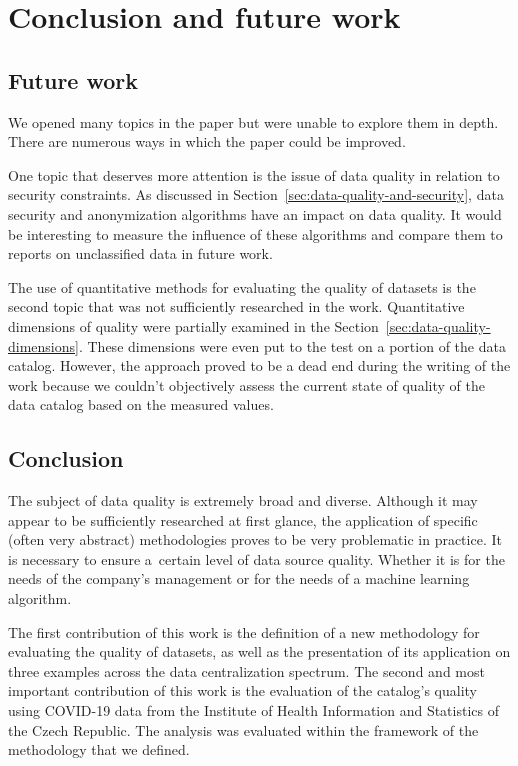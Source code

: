 \chapter{Conclusion and future work}\label{ch:conclusion-and-future-work}

\section{Future work}\label{sec:future-work}

We opened many topics in the paper but were unable to explore them in depth.
There are numerous ways in which the paper could be improved.

One topic that deserves more attention is the issue of data quality in relation to security constraints.
As discussed in Section~\ref{sec:data-quality-and-security}, data security and anonymization algorithms have an impact on data quality.
It would be interesting to measure the influence of these algorithms and compare them to reports on unclassified data in future work.

The use of quantitative methods for evaluating the quality of datasets is the second topic that was not sufficiently researched in the work.
Quantitative dimensions of quality were partially examined in the Section~\ref{sec:data-quality-dimensions}.
These dimensions were even put to the test on a portion of the data catalog.
However, the approach proved to be a dead end during the writing of the work because we couldn't objectively assess the current state of quality of the data catalog based on the measured values.

\section{Conclusion}\label{sec:conclusion}

The subject of data quality is extremely broad and diverse.
Although it may appear to be sufficiently researched at first glance, the application of specific (often very abstract) methodologies proves to be very problematic in practice.
It is necessary to ensure a~certain level of data source quality.
Whether it is for the needs of the company's management or for the needs of a machine learning algorithm.

The first contribution of this work is the definition of a new methodology for evaluating the quality of datasets, as well as the presentation of its application on three examples across the data centralization spectrum.
The second and most important contribution of this work is the evaluation of the catalog's quality using COVID-19 data from the Institute of Health Information and Statistics of the Czech Republic.
The analysis was evaluated within the framework of the methodology that we defined.


